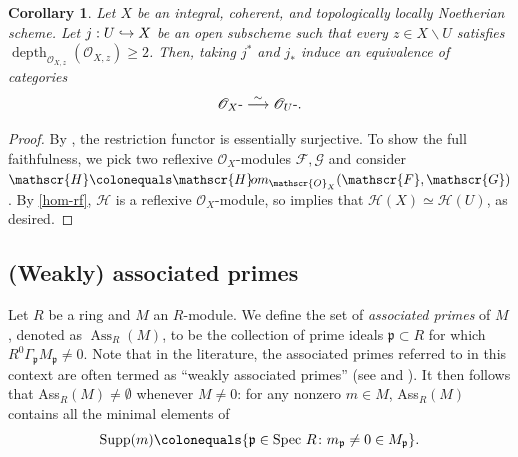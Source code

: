 \documentclass[JEP,XML,SOM,Unicode,published]{cedram}
\newcommand{\NoChangel}[1]{%
\expandafter\let\csname old\string#1\endcsname=#1
\let#1=\relax
\newcommand{#1}{\mathop{\mathcode`l="716C\csname old\string#1\endcsname\mathcode`l="7160}\nolimits}%
}
\newcommand\hto{\mathrel{\lhook\joinrel\to}}
\let\backslash\smallsetminus
\newcommand{\Rflx}{\mathbf{Rflx}}\NoChangel{\Rflx}
\newcommand{\GG}{\Gamma}
\newcommand{\fp}{\mathfrak{p}}
\newcommand{\sF}{\mathscr{F}}
\newcommand{\sG}{\mathscr{G}}
\newcommand{\sH}{\mathscr{H}}
\newcommand{\sO}{\mathscr{O}}
\newcommand{\sHom}{\mathscr{H}\! om}
\let\ce\colonequals
\let\x\text
\newcommand{\isoto}{\overset{\sim}{\longrightarrow}}
\DeclareMathOperator{\Spec}{Spec}
\DeclareMathOperator{\depth}{depth}
\newcommand{\bpf}{\begin{proof}}
\newcommand{\epf}{\end{proof}}
\newcommand{\bcor}{\begin{cor}}
\newcommand{\ecor}{\end{cor}}
\providecommand{\SP}[1]{\cite[\href{https://stacks.math.columbia.edu/tag/#1}{#1}]{SP}}
\theoremstyle{plain}
\newtheorem{cor}[subsection]{Corollary}
\theoremstyle{definition}
\begin{document}
\bcor\label{rf-equiv}
Let $X$ be an integral, coherent, {and topologically locally Noetherian} scheme. Let $j:U\hto X$ be an open subscheme such that every $z\in X\backslash U$ satisfies $\depth_{\sO_{X,z}}(\sO_{X,z})\geq 2$. Then, taking $j^{\ast}$ and $j_{\ast}$ induce an equivalence of categories
\[
\sO_X\x{-}\Rflx\isoto \sO_U\x{-}\Rflx.
\]
\ecor
\bpf
By , the restriction functor is essentially surjective.
To show the full faithfulness, we pick two reflexive $\sO_X$\nobreakdash-mod\-ules $\sF,\sG$ and consider $\sH\ce \sHom_{\sO_X}(\sF,\sG)$.
By \eqref{hom-rf}, $\sH$ is a reflexive $\sO_X$\nobreakdash-mod\-ule, so  implies that $\sH(X)\simeq \sH(U)$, as desired.
\epf

\subsection{(Weakly) {associated} primes}\label{par-(Weakly) associated primes}

Let $R$ be a ring and $M$ an $R$\nobreakdash-mod\-ule. We define the set of \emph{associated primes} of $M$, denoted as $\operatorname{Ass}_R(M)$, to be the collection of prime ideals $\fp \subset R$ for which $R^0\GG_{\fp}M_{\fp}\neq 0$.
{Note that in the literature, the associated primes referred to in this context are often termed as “weakly associated primes” (see \SP{0546} and \cite[Chap.\,IV, \S1, Ex.\,17]{Bou98}).} It then follows that Ass$_R(M)\neq \emptyset$ whenever $M\neq 0$: for any nonzero $m\in M$, Ass$_R(M)$ contains all the minimal elements of
\[
\text{Supp}(m)\ce \{\fp\in \Spec\, R\colon m_{\fp}\neq 0\in M_{\fp}\}.
\]
\end{document}
